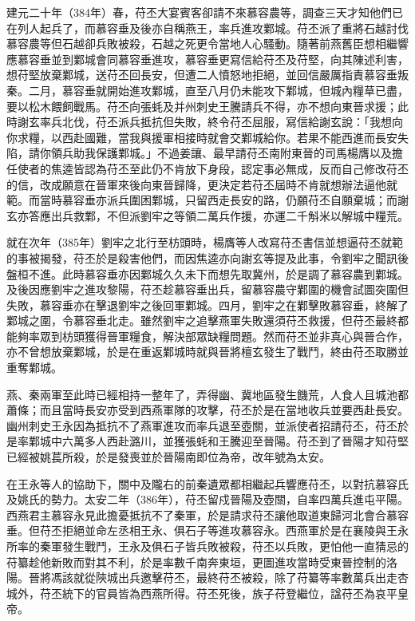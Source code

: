 建元二十年（384年）春，苻丕大宴賓客卻請不來慕容農等，調查三天才知他們已在列人起兵了，而慕容垂及後亦自稱燕王，率兵進攻鄴城。苻丕派了重將石越討伐慕容農等但石越卻兵敗被殺，石越之死更令當地人心騷動。隨著前燕舊臣想相繼響應慕容垂並到鄴城會同慕容垂進攻，慕容垂更寫信給苻丕及苻堅，向其陳述利害，想苻堅放棄鄴城，送苻丕回長安，但遭二人憤怒地拒絕，並回信嚴厲指責慕容垂叛秦。二月，慕容垂就開始進攻鄴城，直至八月仍未能攻下鄴城，但城內糧草已盡，要以松木餵飼戰馬。苻丕向張蚝及并州刺史王騰請兵不得，亦不想向東晉求援；此時謝玄率兵北伐，苻丕派兵抵抗但失敗，終令苻丕屈服，寫信給謝玄說：「我想向你求糧，以西赴國難，當我與援軍相接時就會交鄴城給你。若果不能西進而長安失陷，請你領兵助我保護鄴城。」不過姜讓、最早請苻丕南附東晉的司馬楊膺以及擔任使者的焦逵皆認為苻丕至此仍不肯放下身段，認定事必無成，反而自己修改苻丕的信，改成願意在晉軍來後向東晉歸降，更決定若苻丕屆時不肯就想辦法逼他就範。而當時慕容垂亦派兵圍困鄴城，只留西走長安的路，仍願苻丕自願棄城；而謝玄亦答應出兵救鄴，不但派劉牢之等領二萬兵作援，亦運二千斛米以解城中糧荒。

就在次年（385年）劉牢之北行至枋頭時，楊膺等人改寫苻丕書信並想逼苻丕就範的事被揭發，苻丕於是殺害他們，而因焦逵亦向謝玄等提及此事，令劉牢之聞訊後盤桓不進。此時慕容垂亦因鄴城久久未下而想先取冀州，於是調了慕容農到鄴城。及後因應劉牢之進攻黎陽，苻丕趁慕容垂出兵，留慕容農守鄴圍的機會試圖突圍但失敗，慕容垂亦在擊退劉牢之後回軍鄴城。四月，劉牢之在鄴擊敗慕容垂，終解了鄴城之圍，令慕容垂北走。雖然劉牢之追擊燕軍失敗還須苻丕救援，但苻丕最終都能夠率眾到枋頭獲得晉軍糧食，解決部眾缺糧問題。然而苻丕並非真心與晉合作，亦不曾想放棄鄴城，於是在重返鄴城時就與晉將檀玄發生了戰鬥，終由苻丕取勝並重奪鄴城。

燕、秦兩軍至此時已經相持一整年了，弄得幽、冀地區發生饑荒，人食人且城池都蕭條；而且當時長安亦受到西燕軍隊的攻擊，苻丕於是在當地收兵並要西赴長安。幽州刺史王永因為抵抗不了燕軍進攻而率兵退至壺關，並派使者招請苻丕，苻丕於是率鄴城中六萬多人西赴潞川，並獲張蚝和王騰迎至晉陽。苻丕到了晉陽才知苻堅已經被姚萇所殺，於是發喪並於晉陽南即位為帝，改年號為太安。

在王永等人的協助下，關中及隴右的前秦遺眾都相繼起兵響應苻丕，以對抗慕容氏及姚氏的勢力。太安二年（386年），苻丕留戍晉陽及壺關，自率四萬兵進屯平陽。西燕君主慕容永見此擔憂抵抗不了秦軍，於是請求苻丕讓他取道東歸河北會合慕容垂。但苻丕拒絕並命左丞相王永、俱石子等進攻慕容永。西燕軍於是在襄陵與王永所率的秦軍發生戰鬥，王永及俱石子皆兵敗被殺，苻丕以兵敗，更怕他一直猜忌的苻纂趁他新敗而對其不利，於是率數千南奔東垣，更圖進攻當時受東晉控制的洛陽。晉將馮該就從陝城出兵邀擊苻丕，最終苻丕被殺，除了苻纂等率數萬兵出走杏城外，苻丕統下的官員皆為西燕所得。苻丕死後，族子苻登繼位，諡苻丕為哀平皇帝。


